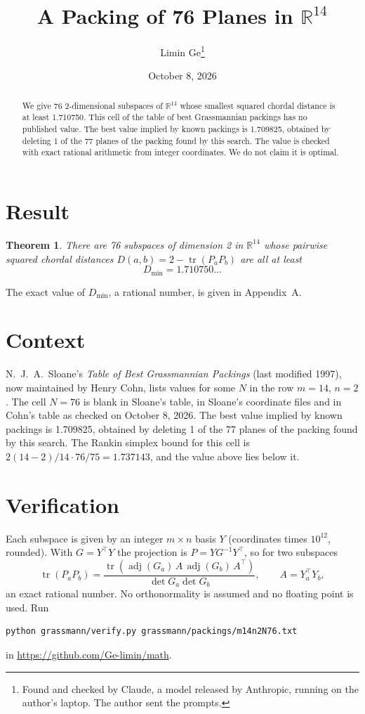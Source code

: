 \documentclass[11pt,a4paper]{article}
\title{A Packing of 76 Planes in $\mathbb{R}^{14}$}
\author{Limin Ge\thanks{Found and checked by Claude, a model released by Anthropic, running on the author's laptop. The author sent the prompts.}}
\date{October 8, 2026}
\newtheorem*{theorem}{Theorem}
\begin{document}
\maketitle
\begin{abstract}
We give 76 2-dimensional subspaces of $\mathbb{R}^{14}$ whose smallest squared chordal distance is at least 1.710750. This cell of the table of best Grassmannian packings has no published value. The best value implied by known packings is 1.709825, obtained by deleting 1 of the 77 planes of the packing found by this search. The value is checked with exact rational arithmetic from integer coordinates. We do not claim it is optimal.
\end{abstract}

\section{Result}
\begin{theorem}
There are 76 subspaces of dimension 2 in $\mathbb{R}^{14}$ whose pairwise squared chordal distances $D(a,b) = 2 - \operatorname{tr}(P_aP_b)$ are all at least
\[ D_{\min} = 1.710750\ldots \]
\end{theorem}
The exact value of $D_{\min}$, a rational number, is given in Appendix~A.


\section{Context}
N.~J.~A.~Sloane's \emph{Table of Best Grassmannian Packings} (last modified 1997), now maintained by Henry Cohn, lists values for some $N$ in the row $m=14$, $n=2$. The cell $N=76$ is blank in Sloane's table, in Sloane's coordinate files and in Cohn's table as checked on October 8, 2026. The best value implied by known packings is 1.709825, obtained by deleting 1 of the 77 planes of the packing found by this search. The Rankin simplex bound for this cell is $2(14-2)/14\cdot 76/75 = 1.737143$, and the value above lies below it.


\section{Verification}
Each subspace is given by an integer $m\times n$ basis $Y$ (coordinates times $10^{12}$, rounded). With $G=Y^\top Y$ the projection is $P=YG^{-1}Y^\top$, so for two subspaces
\[ \operatorname{tr}(P_aP_b)=\frac{\operatorname{tr}(\operatorname{adj}(G_a)\,A\,\operatorname{adj}(G_b)\,A^\top)}{\det G_a\det G_b},\qquad A=Y_a^\top Y_b, \]
an exact rational number. No orthonormality is assumed and no floating point is used. Run
\begin{verbatim}
python grassmann/verify.py grassmann/packings/m14n2N76.txt
\end{verbatim}
in \url{https://github.com/Ge-limin/math}.
\end{document}
